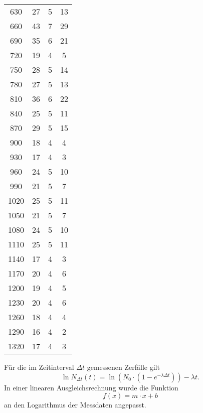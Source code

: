 \begin{longtable}{c c c c}
		 630   	&       27  	&  5 &       13 \\
		 660   	&       43  	&  7 &       29 \\
		 690   	&       35  	&  6 &       21 \\
		 720   	&       19  	&  4 &        5 \\
		 750   	&       28  	&  5 &       14 \\
		 780   	&       27  	&  5 &       13 \\
		 810   	&       36  	&  6 &       22 \\
		 840   	&       25  	&  5 &       11 \\
		 870   	&       29  	&  5 &       15 \\
		 900   	&       18  	&  4 &        4 \\
		 930   	&       17  	&  4 &        3 \\
		 960   	&       24  	&  5 &       10 \\
		 990   	&       21  	&  5 &        7 \\
		1020   	&       25  	&  5 &       11 \\
		1050   	&       21  	&  5 &        7 \\
		1080   	&       24  	&  5 &       10 \\
		1110   	&       25  	&  5 &       11 \\
		1140   	&       17  	&  4 &        3 \\
		1170   	&       20  	&  4 &        6 \\
		1200   	&       19  	&  4 &        5 \\
		1230   	&       20  	&  4 &        6 \\
		1260   	&       18  	&  4 &        4 \\
		1290   	&       16  	&  4 &        2 \\
		1320   	&       17  	&  4 &        3 \\
\end{longtable}
\noindent
Für die im Zeitinterval $\Delta t$ gemessenen Zerfälle gilt
\begin{equation}
	\ln N_{\Delta t}(t) = \ln\left( N_0 \cdot \left(1 - e^{-\lambda \Delta t}\right) \right) - \lambda t.
	\label{eqn:logarithmisch}
\end{equation}
\noindent
In einer linearen Ausgleichsrechnung wurde die Funktion 
\begin{equation}
	f(x) = m \cdot x + b
	\label{eqn:mx+b}
\end{equation}
\noindent
an den Logarithmus der Messdaten angepasst. 
